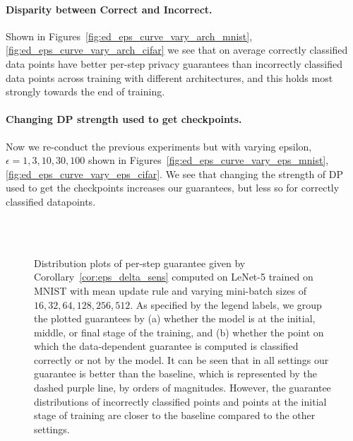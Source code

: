 \paragraph{Disparity between Correct and Incorrect.} Shown in Figures~\ref{fig:ed_eps_curve_vary_arch_mnist},\ref{fig:ed_eps_curve_vary_arch_cifar} we see that on average correctly classified data points have better per-step privacy guarantees than incorrectly classified data points across training with different architectures, and this holds most strongly towards the end of training. 


\paragraph{Changing DP strength used to get checkpoints.} Now we re-conduct the previous experiments but with varying epsilon, $\epsilon = 1, 3, 10, 30, 100$ shown in Figures~\ref{fig:ed_eps_curve_vary_eps_mnist},\ref{fig:ed_eps_curve_vary_eps_cifar}. We see that changing the strength of DP used to get the checkpoints increases our guarantees, but less so for correctly classified datapoints.










\begin{figure}[t]
\centering
{}
\\
\\
\caption{Distribution plots of per-step guarantee given by Corollary~\ref{cor:eps_delta_sens} computed on LeNet-5 trained on MNIST with mean update rule and varying mini-batch sizes of $16, 32, 64, 128, 256, 512$. As specified by the legend labels, we group the plotted guarantees by (a) whether the model is at the initial, middle, or final stage of the training, and (b) whether the point on which the data-dependent guarantee is computed is classified correctly or not by the model. It can be seen that in all settings our guarantee is better than the baseline, which is represented by the dashed purple line, by orders of magnitudes. However, the guarantee distributions of incorrectly classified points and points at the initial stage of training are closer to the baseline compared to the other settings.
}
\label{fig:ed_eps_distrib_bs_mnist_mean}
\end{figure}


